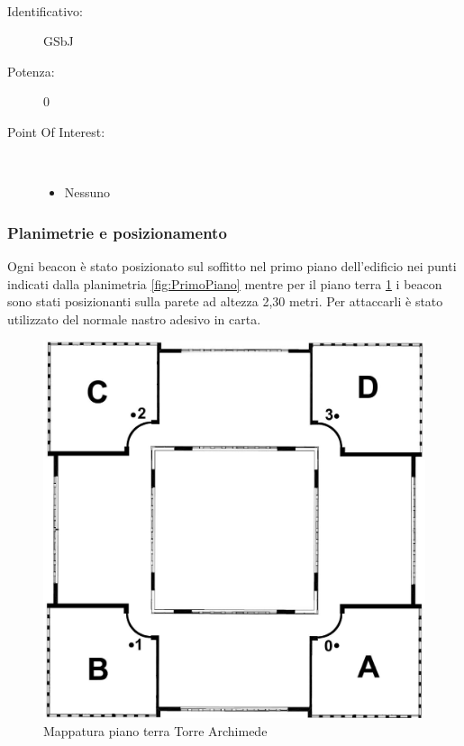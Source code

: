 \documentclass[../SperimentazioniPratiche.tex]{subfiles}
\begin{document}
			\paragraph*{}
			\label{01007}
			\begin{tcolorbox}[fonttitle=\bfseries, 
								adjusted title={\Large Beacon 01007},
								sharp corners=south,
								colback=white, 
								colframe=white!50!blue!75!black]
								
				\begin{description}
					\item[Identificativo:] GSbJ
					\item[Potenza:] 0

					\tcbline					
					
					\item[Point Of Interest:] \ \par
					\begin{itemize}
						\item Nessuno
					\end{itemize}					   				
				\end{description}  				
			\end{tcolorbox}
			
		
		
		\newpage
		\subsubsection{Planimetrie e posizionamento}
			Ogni beacon è stato posizionato sul soffitto nel primo piano dell'edificio nei punti indicati dalla planimetria \ref{fig:PrimoPiano} mentre per il piano terra \ref{fig:PianoTerra} i beacon sono stati posizionanti sulla parete ad altezza 2,30 metri. Per attaccarli è stato utilizzato del normale nastro adesivo in carta.
			
			\begin{figure}[h]
				\includegraphics[width=\textwidth]{img/PianoTerra}
				\caption{Mappatura piano terra Torre Archimede}
				\label{fig:PianoTerra}
			\end{figure}						
\end{document}
